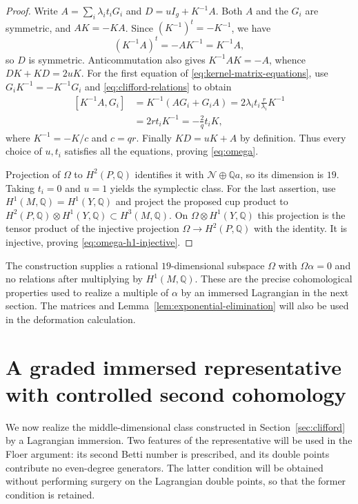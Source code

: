 \documentclass[11pt]{article}
\numberwithin{equation}{section}
\theoremstyle{definition}
\theoremstyle{remark}
\newcommand{\Q}{\mathbb Q}
\begin{document}
\begin{proof}
Write $A=\sum_i\lambda_it_iG_i$ and $D=uI_g+K^{-1}A$.
Both $A$ and the $G_i$ are symmetric, and $AK=-KA$.
Since $(K^{-1})^t=-K^{-1}$, we have
\[
 (K^{-1}A)^t=-AK^{-1}=K^{-1}A,
\]
so $D$ is symmetric.  Anticommutation also gives
$K^{-1}AK=-A$, whence $DK+KD=2uK$.
For the first equation of \eqref{eq:kernel-matrix-equations}, use
$G_iK^{-1}=-K^{-1}G_i$ and \eqref{eq:clifford-relations} to obtain
\[
 \begin{aligned}
 [K^{-1}A,G_i]
   &=K^{-1}(AG_i+G_iA)
     =2\lambda_it_i\frac r{\lambda_i}K^{-1}\\
   &=2rt_iK^{-1}
     =-\frac2q t_iK,
 \end{aligned}
\]
where $K^{-1}=-K/c$ and $c=qr$.
Finally $KD=uK+A$ by definition.  Thus every choice of $u,t_i$
satisfies all the equations, proving \eqref{eq:omega}.

Projection of $\Omega$ to $H^2(P,\Q)$ identifies it with
$\mathcal N\oplus\Q a$, so its dimension is $19$.
Taking $t_i=0$ and $u=1$ yields the symplectic class.
For the last assertion, use $H^1(M,\Q)=H^1(Y,\Q)$ and project
the proposed cup product to
$H^2(P,\Q)\otimes H^1(Y,\Q)\subset H^3(M,\Q)$.
On $\Omega\otimes H^1(Y,\Q)$ this projection is the tensor product
of the injective projection $\Omega\to H^2(P,\Q)$ with the identity.
It is injective, proving \eqref{eq:omega-h1-injective}.
\end{proof}

The construction supplies a rational $19$-dimensional subspace
$\Omega$ with $\Omega\alpha=0$ and no relations after multiplying
by $H^1(M,\Q)$.  These are the precise cohomological properties used
to realize a multiple of $\alpha$ by an immersed Lagrangian in the
next section.  The matrices and Lemma~\ref{lem:exponential-elimination}
will also be used in the deformation calculation.


\section{A graded immersed representative with controlled second cohomology}
\label{sec:topology}

We now realize the middle-dimensional class constructed in
Section~\ref{sec:clifford} by a Lagrangian immersion.  Two features of the
representative will be used in the Floer argument: its second Betti number
is prescribed, and its double points contribute no even-degree generators.
The latter condition will be obtained without performing surgery on the
Lagrangian double points, so that the former condition is retained.
\end{document}
